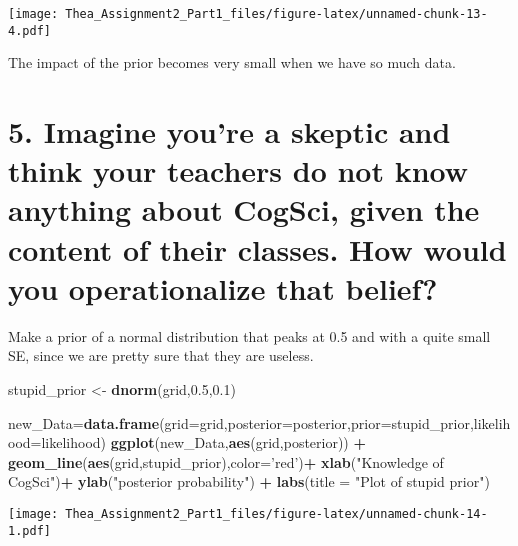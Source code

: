 \documentclass[]{article}
\newenvironment{Shaded}{\begin{snugshade}}{\end{snugshade}}
\newcommand{\KeywordTok}[1]{\textcolor[rgb]{0.13,0.29,0.53}{\textbf{#1}}}
\newcommand{\DataTypeTok}[1]{\textcolor[rgb]{0.13,0.29,0.53}{#1}}
\newcommand{\FloatTok}[1]{\textcolor[rgb]{0.00,0.00,0.81}{#1}}
\newcommand{\StringTok}[1]{\textcolor[rgb]{0.31,0.60,0.02}{#1}}
\newcommand{\OperatorTok}[1]{\textcolor[rgb]{0.81,0.36,0.00}{\textbf{#1}}}
\newcommand{\NormalTok}[1]{#1}
\begin{document}
\texttt{[image: Thea\_Assignment2\_Part1\_files/figure-latex/unnamed-chunk-13-4.pdf]}

The impact of the prior becomes very small when we have so much data.

\section{5. Imagine you're a skeptic and think your teachers do not know
anything about CogSci, given the content of their classes. How would you
operationalize that
belief?}\label{imagine-youre-a-skeptic-and-think-your-teachers-do-not-know-anything-about-cogsci-given-the-content-of-their-classes.-how-would-you-operationalize-that-belief}

Make a prior of a normal distribution that peaks at 0.5 and with a quite
small SE, since we are pretty sure that they are useless.

\begin{Shaded}
\begin{Highlighting}[]
\NormalTok{stupid_prior <-}\StringTok{ }\KeywordTok{dnorm}\NormalTok{(grid,}\FloatTok{0.5}\NormalTok{,}\FloatTok{0.1}\NormalTok{)}

\NormalTok{new_Data=}\KeywordTok{data.frame}\NormalTok{(}\DataTypeTok{grid=}\NormalTok{grid,}\DataTypeTok{posterior=}\NormalTok{posterior,}\DataTypeTok{prior=}\NormalTok{stupid_prior,}\DataTypeTok{likelihood=}\NormalTok{likelihood)}
\KeywordTok{ggplot}\NormalTok{(new_Data,}\KeywordTok{aes}\NormalTok{(grid,posterior)) }\OperatorTok{+}\StringTok{ }\KeywordTok{geom_line}\NormalTok{(}\KeywordTok{aes}\NormalTok{(grid,stupid_prior),}\DataTypeTok{color=}\StringTok{'red'}\NormalTok{)}\OperatorTok{+}\StringTok{ }\KeywordTok{xlab}\NormalTok{(}\StringTok{"Knowledge of CogSci"}\NormalTok{)}\OperatorTok{+}\StringTok{ }\KeywordTok{ylab}\NormalTok{(}\StringTok{"posterior probability"}\NormalTok{) }\OperatorTok{+}\StringTok{ }\KeywordTok{labs}\NormalTok{(}\DataTypeTok{title =} \StringTok{"Plot of stupid prior"}\NormalTok{)}
\end{Highlighting}
\end{Shaded}

\texttt{[image: Thea\_Assignment2\_Part1\_files/figure-latex/unnamed-chunk-14-1.pdf]}
\end{document}
